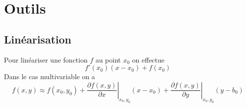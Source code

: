 \documentclass[resume]{subfiles}
\begin{document}
\section{Outils}
\subsection{Linéarisation}
Pour linéariser une fonction $f$ au point $x_0$ on effectue
$$f'(x_0)(x-x_0)+f(x_0)$$
Dans le cas multivariable on a
$$f(x,y) \approx f(x_0,y_0) + \left. {\frac{{\partial f(x,y)}}{{\partial x}}} \right|_{x_0,y_0} (x - x_0) + \left. {\frac{{\partial f(x,y)}}{{\partial y}}} \right|_{x_0,y_0} (y - b_0)$$
\end{document}

